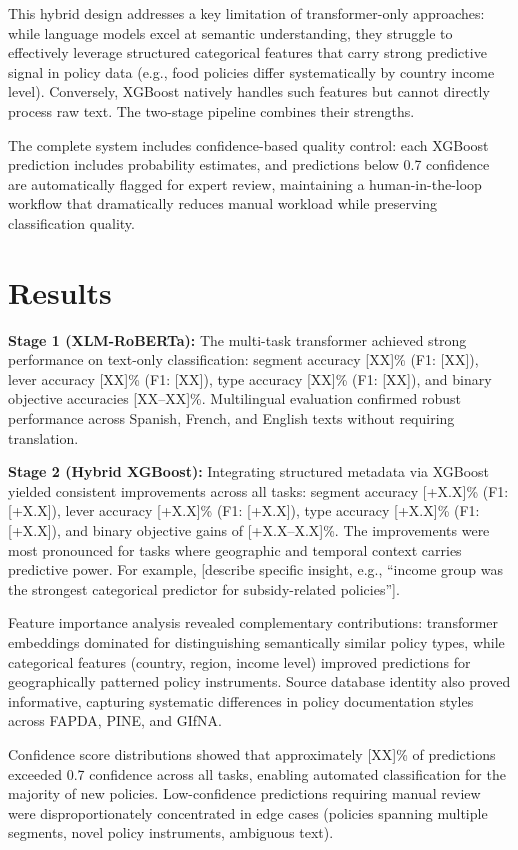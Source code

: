 \documentclass[a4paper,12pt]{article}
\begin{document}
This hybrid design addresses a key limitation of transformer-only approaches: while language models excel at semantic understanding, they struggle to effectively leverage structured categorical features that carry strong predictive signal in policy data (e.g., food policies differ systematically by country income level). Conversely, XGBoost natively handles such features but cannot directly process raw text. The two-stage pipeline combines their strengths.

The complete system includes confidence-based quality control: each XGBoost prediction includes probability estimates, and predictions below 0.7 confidence are automatically flagged for expert review, maintaining a human-in-the-loop workflow that dramatically reduces manual workload while preserving classification quality.

\section*{Results}

\textbf{Stage 1 (XLM-RoBERTa):} The multi-task transformer achieved strong performance on text-only classification: segment accuracy [XX]\% (F1: [XX]), lever accuracy [XX]\% (F1: [XX]), type accuracy [XX]\% (F1: [XX]), and binary objective accuracies [XX--XX]\%. Multilingual evaluation confirmed robust performance across Spanish, French, and English texts without requiring translation.

\textbf{Stage 2 (Hybrid XGBoost):} Integrating structured metadata via XGBoost yielded consistent improvements across all tasks: segment accuracy [+X.X]\% (F1: [+X.X]), lever accuracy [+X.X]\% (F1: [+X.X]), type accuracy [+X.X]\% (F1: [+X.X]), and binary objective gains of [+X.X--X.X]\%. The improvements were most pronounced for tasks where geographic and temporal context carries predictive power. For example, [describe specific insight, e.g., ``income group was the strongest categorical predictor for subsidy-related policies''].

Feature importance analysis revealed complementary contributions: transformer embeddings dominated for distinguishing semantically similar policy types, while categorical features (country, region, income level) improved predictions for geographically patterned policy instruments. Source database identity also proved informative, capturing systematic differences in policy documentation styles across FAPDA, PINE, and GIfNA.

Confidence score distributions showed that approximately [XX]\% of predictions exceeded 0.7 confidence across all tasks, enabling automated classification for the majority of new policies. Low-confidence predictions requiring manual review were disproportionately concentrated in edge cases (policies spanning multiple segments, novel policy instruments, ambiguous text).
\end{document}

